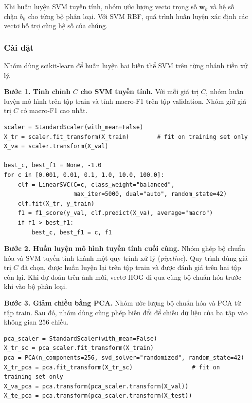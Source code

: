 Khi huấn luyện SVM tuyến tính, nhóm ước lượng vectơ trọng số $\mathbf{w}_k$ và hệ số chặn $b_k$ cho từng bộ phân loại. Với SVM RBF, quá trình huấn luyện xác định các vectơ hỗ trợ cùng hệ số của chúng.

\subsubsection{Cài đặt}

Nhóm dùng scikit-learn để huấn luyện hai biến thể SVM trên từng nhánh tiền xử lý.

\textbf{Bước 1. Tinh chỉnh $C$ cho SVM tuyến tính.} Với mỗi giá trị $C$, nhóm huấn luyện mô hình trên tập train và tính macro-F1 trên tập validation. Nhóm giữ giá trị $C$ có macro-F1 cao nhất.

\begin{lstlisting}[caption={Tinh chỉnh $C$ cho SVM tuyến tính (rút gọn)},label={lst:tune_linear}]
scaler = StandardScaler(with_mean=False)
X_tr = scaler.fit_transform(X_train)        # fit on training set only
X_va = scaler.transform(X_val)

best_c, best_f1 = None, -1.0
for c in [0.001, 0.01, 0.1, 1.0, 10.0, 100.0]:
    clf = LinearSVC(C=c, class_weight="balanced",
                    max_iter=5000, dual="auto", random_state=42)
    clf.fit(X_tr, y_train)
    f1 = f1_score(y_val, clf.predict(X_va), average="macro")
    if f1 > best_f1:
        best_c, best_f1 = c, f1
\end{lstlisting}

\textbf{Bước 2. Huấn luyện mô hình tuyến tính cuối cùng.} Nhóm ghép bộ chuẩn hóa và SVM tuyến tính thành một quy trình xử lý (\emph{pipeline}). Quy trình dùng giá trị $C$ đã chọn, được huấn luyện lại trên tập train và được đánh giá trên hai tập còn lại. Khi dự đoán trên ảnh mới, vectơ HOG đi qua cùng bộ chuẩn hóa trước khi vào bộ phân loại.

\textbf{Bước 3. Giảm chiều bằng PCA.} Nhóm ước lượng bộ chuẩn hóa và PCA từ tập train. Sau đó, nhóm dùng cùng phép biến đổi để chiếu dữ liệu của ba tập vào không gian 256 chiều.

\begin{lstlisting}[caption={Giảm chiều trước SVM RBF (rút gọn)},label={lst:pca}]
pca_scaler = StandardScaler(with_mean=False)
X_tr_sc = pca_scaler.fit_transform(X_train)
pca = PCA(n_components=256, svd_solver="randomized", random_state=42)
X_tr_pca = pca.fit_transform(X_tr_sc)                 # fit on training set only
X_va_pca = pca.transform(pca_scaler.transform(X_val))
X_te_pca = pca.transform(pca_scaler.transform(X_test))
\end{lstlisting}

